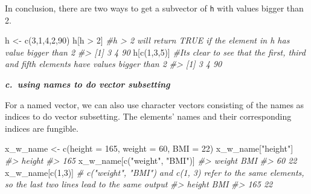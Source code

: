 \documentclass[
]{book}
\newenvironment{Shaded}{\begin{snugshade}}{\end{snugshade}}
\newcommand{\AttributeTok}[1]{\textcolor[rgb]{0.77,0.63,0.00}{#1}}
\newcommand{\CommentTok}[1]{\textcolor[rgb]{0.56,0.35,0.01}{\textit{#1}}}
\newcommand{\DecValTok}[1]{\textcolor[rgb]{0.00,0.00,0.81}{#1}}
\newcommand{\FunctionTok}[1]{\textcolor[rgb]{0.00,0.00,0.00}{#1}}
\newcommand{\NormalTok}[1]{#1}
\newcommand{\OtherTok}[1]{\textcolor[rgb]{0.56,0.35,0.01}{#1}}
\newcommand{\SpecialCharTok}[1]{\textcolor[rgb]{0.00,0.00,0.00}{#1}}
\newcommand{\StringTok}[1]{\textcolor[rgb]{0.31,0.60,0.02}{#1}}
\newenvironment{blackbox}{
  \definecolor{shadecolor}{rgb}{0, 0, 0}  %
  \color{white}
  \begin{shaded}}
 {\end{shaded}}
\newenvironment{infobox}[1]
  {
  \begin{itemize}
  \renewcommand{\labelitemi}{
    \raisebox{-.7\height}[0pt][0pt]{
      {\setkeys{Gin}{width=3em,keepaspectratio}
        \texttt{[image: pics/\#1]}}
    }
  }
  \setlength{\fboxsep}{1em}
  \begin{blackbox}
  \item
  }
  {
  \end{blackbox}
  \end{itemize}
  }
\begin{document}
\begin{infobox}{caution}

In conclusion, there are two ways to get a subvector of \texttt{h} with values bigger than 2.

\begin{Shaded}
\begin{Highlighting}[]
\NormalTok{h }\OtherTok{\textless{}{-}} \FunctionTok{c}\NormalTok{(}\DecValTok{3}\NormalTok{,}\DecValTok{1}\NormalTok{,}\DecValTok{4}\NormalTok{,}\DecValTok{2}\NormalTok{,}\DecValTok{90}\NormalTok{)}
\NormalTok{h[h }\SpecialCharTok{\textgreater{}} \DecValTok{2}\NormalTok{]      }\CommentTok{\#h \textgreater{} 2 will return TRUE if the element in h has value bigger than 2}
\CommentTok{\#\textgreater{} [1]  3  4 90}
\NormalTok{h[}\FunctionTok{c}\NormalTok{(}\DecValTok{1}\NormalTok{,}\DecValTok{3}\NormalTok{,}\DecValTok{5}\NormalTok{)]   }\CommentTok{\#It\textquotesingle{}s clear to see that the first, third and fifth elements have values bigger than 2}
\CommentTok{\#\textgreater{} [1]  3  4 90}
\end{Highlighting}
\end{Shaded}

\end{infobox}

\textbf{\emph{c.~using names to do vector subsetting}}

For a named vector, we can also use character vectors consisting of the names as indices to do vector subsetting. The elements' names and their corresponding indices are fungible.

\begin{Shaded}
\begin{Highlighting}[]
\NormalTok{x\_w\_name }\OtherTok{\textless{}{-}} \FunctionTok{c}\NormalTok{(}\AttributeTok{height =} \DecValTok{165}\NormalTok{, }\AttributeTok{weight =} \DecValTok{60}\NormalTok{, }\AttributeTok{BMI =} \DecValTok{22}\NormalTok{)}
\NormalTok{x\_w\_name[}\StringTok{"height"}\NormalTok{]}
\CommentTok{\#\textgreater{} height }
\CommentTok{\#\textgreater{}    165}
\NormalTok{x\_w\_name[}\FunctionTok{c}\NormalTok{(}\StringTok{"weight"}\NormalTok{, }\StringTok{"BMI"}\NormalTok{)]}
\CommentTok{\#\textgreater{} weight    BMI }
\CommentTok{\#\textgreater{}     60     22}
\NormalTok{x\_w\_name[}\FunctionTok{c}\NormalTok{(}\DecValTok{1}\NormalTok{,}\DecValTok{3}\NormalTok{)] }\CommentTok{\# c("weight", "BMI") and c(1, 3) refer to the same elements, so the last two lines lead to the same output}
\CommentTok{\#\textgreater{} height    BMI }
\CommentTok{\#\textgreater{}    165     22}
\end{Highlighting}
\end{Shaded}
\end{document}
